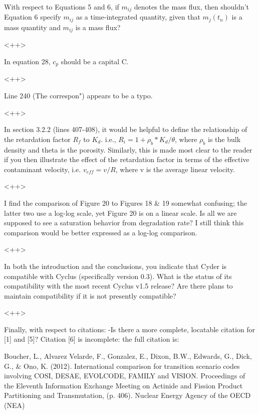 \documentclass[answers,12pt]{exam}
\begin{document}
\begin{questions}
\question With respect to Equations 5 and 6, if $m_{ij}$ denotes the mass flux, 
then shouldn't Equation 6 specify $m_{ij}$ as a time-integrated quantity, given 
that $m_j(t_n)$ is a mass quantity and $m_{ij}$ is a mass flux?
\begin{solution}
<++>
\end{solution}

\question In equation 28, $c_p$ should be a capital C.
\begin{solution}
<++>
\end{solution}

\question Line 240 (The correspon") appears to be a typo.
\begin{solution}
<++>
\end{solution}

\question In section 3.2.2 (lines 407-408), it would be helpful to define the relationship of the retardation factor $R_f$ to $K_d$. i.e., $R_i = 1 + \rho_b 
* K_d / \theta$, where $\rho_b$ is the bulk density and theta is the porosity.  Similarly, this is made most clear to the reader if you then illustrate the effect of the retardation factor in terms of the effective contaminant velocity, i.e. $v_{eff} = v/R$, where v is the average linear velocity.
\begin{solution}
<++>
\end{solution}

\question I find the comparison of Figure 20 to Figures 18 \& 19 somewhat confusing; the latter two use a log-log scale, yet Figure 20 is on a linear scale. Is all we are supposed to see a saturation behavior from degradation rate? I still think this comparison would be better expressed as a log-log comparison.
\begin{solution}
<++>
\end{solution}

\question In both the introduction and the conclusions, you indicate that Cyder is compatible with Cyclus (specifically version 0.3). What is the status of its compatibility with the most recent Cyclus v1.5 release? Are there plans to maintain compatibility if it is not presently compatible?
\begin{solution}
<++>
\end{solution}

\question Finally, with respect to citations: 
-Is there a more complete, locatable citation for [1] and [5]? Citation [6] is incomplete: the full citation is:

Boucher, L., Alvarez Velarde, F., Gonzalez, E., Dixon, B.W., Edwards, G., Dick, 
G., \& Ono, K. (2012). International comparison for transition scenario codes involving COSI, DESAE, EVOLCODE, FAMILY and VISION. Proceedings of the Eleventh Information Exchange Meeting on Actinide and Fission Product Partitioning and Transmutation, (p. 406). Nuclear Energy Agency of the OECD (NEA)


\end{questions}
\end{document}
